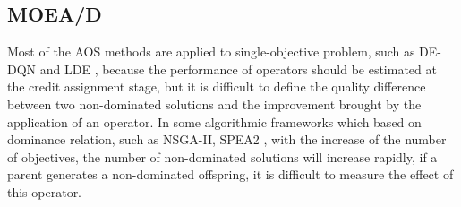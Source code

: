 \documentclass[journal]{IEEEtran}
\begin{document}
\subsection{MOEA/D}
Most of the AOS methods are applied to single-objective problem, such as DE-DQN\cite{sharma2019deep} and LDE \cite{sun2021learning}, because the performance of operators should be estimated at the credit assignment stage, but it is difficult to define the quality difference between two non-dominated solutions and the improvement brought by the application of an operator.
In some algorithmic frameworks which based on dominance relation, such as NSGA-II\cite{nsga2}, SPEA2 \cite{spea2}, with the increase of the number of objectives, the number of non-dominated solutions will increase rapidly,
if a parent generates a non-dominated offspring, it is difficult to measure the effect of this operator.
\end{document}
